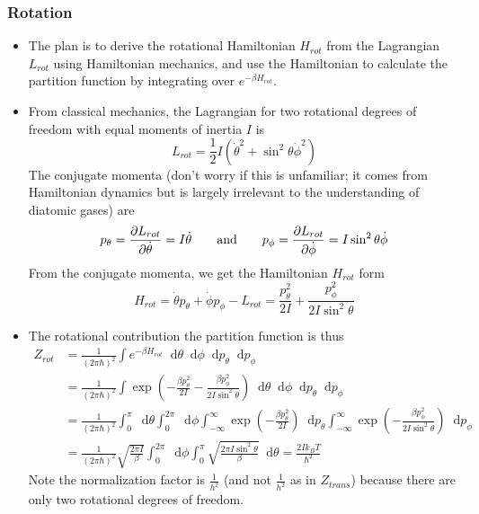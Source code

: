 \documentclass[11pt, a4paper]{article}
\newcommand{\diff}{\mathop{}\!\mathrm{d}} %
\begin{document}
\subsubsection{Rotation}
\begin{itemize}
	\item The plan is to derive the rotational Hamiltonian $ H_{rot} $ from the Lagrangian $ L_{rot} $ using Hamiltonian mechanics, and use the Hamiltonian to calculate the partition function by integrating over $ e^{-\beta H_{rot}} $. 
	
	\item From classical mechanics, the Lagrangian for two rotational degrees of freedom with equal moments of inertia $ I $ is
	\begin{equation*}
		L_{rot} = \frac{1}{2} I\left(\dot{\theta}^{2} + \sin^{2}\theta \dot{\phi}^{2}\right)
	\end{equation*}
	The conjugate momenta (don't worry if this is unfamiliar; it comes from Hamiltonian dynamics but is largely irrelevant to the understanding of diatomic gases) are
	\begin{equation*}
		p_{\theta}  = \pdv{L_{rot}}{\dot{\theta}} = I \dot{\theta} \qquad \text{and} \qquad p_{\phi}  = \pdv{L_{rot}}{\dot{\phi}} = I \sin^{2}\theta \dot{\phi}
	\end{equation*}
	From the conjugate momenta, we get the Hamiltonian $ H_{rot} $ form
	\begin{equation*}
		H_{rot} = \dot{\theta}p_{\theta} + \dot{\phi}p_{\phi} - L_{rot} = \frac{p_{\theta}^{2}}{2I} + \frac{p_{\phi}^{2}}{2I\sin^{2}\theta}
	\end{equation*}
	
	\item The rotational contribution the partition function is thus
	\begin{align*}
		Z_{rot} &= \frac{1}{(2\pi \hbar)^{2}} \int e^{-\beta H_{rot}} \diff \theta \diff \phi \diff p_{\theta} \diff p_{\phi}\\
		& = \frac{1}{(2\pi \hbar)^{2}} \int \exp(-  \frac{\beta p_{\theta}^{2}}{2I} -  \frac{\beta p_{\phi}^{2}}{2I\sin^{2}\theta}) \diff \theta \diff \phi \diff p_{\theta} \diff p_{\phi}\\
		&= \frac{1}{(2\pi \hbar)^{2}}  \int_{0}^{\pi} \diff \theta  \int_{0}^{2\pi} \diff \phi \int_{-\infty}^{\infty} \exp(-  \frac{\beta p_{\theta}^{2}}{2I}) \diff p_{\theta} \int_{-\infty}^{\infty} \exp(-  \frac{\beta p_{\phi}^{2}}{2I\sin^{2}\theta}) \diff p_{\phi}\\
		&=\frac{1}{(2\pi \hbar)^{2}} \sqrt{\frac{2\pi I}{\beta}}  \int_{0}^{2\pi} \diff \phi  \int_{0}^{\pi} \sqrt{\frac{2\pi I \sin^{2}\theta}{\beta}} \diff \theta = \frac{2Ik_{B}T}{\hbar^{2}}
	\end{align*}
	Note the normalization factor is $\frac{1}{h^{2}}$ (and not $ \frac{1}{h^{2}} $ as in $ Z_{trans} $) because there are only two rotational degrees of freedom.
	

\end{itemize}
\end{document}
